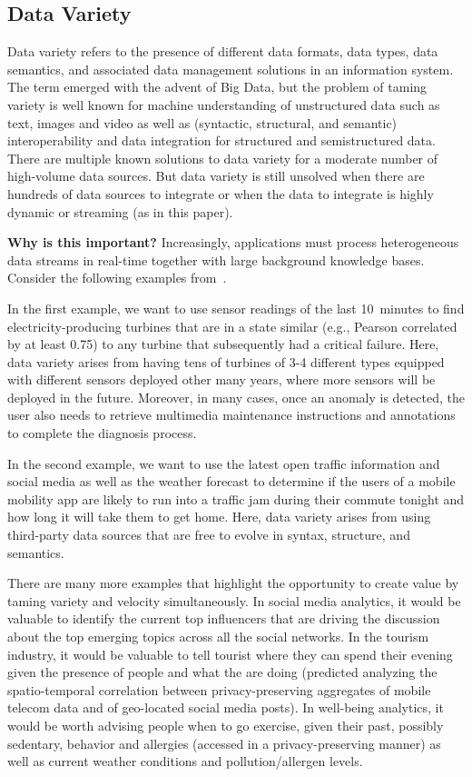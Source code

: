 \subsection{Data Variety}

Data variety refers to the presence of different data formats, data
types, data semantics, and associated data management solutions in an
information system. The term emerged with the advent of Big Data, but
the problem of taming variety is well known for machine understanding
of unstructured data such as text, images and video as well as
(syntactic, structural, and semantic) interoperability and data
integration for structured and semistructured data.  There are
multiple known solutions to data variety for a moderate number of
high-volume data sources.  But data variety is still unsolved when
there are hundreds of data sources to integrate or when the data to
integrate is highly dynamic or streaming (as in this paper).

\textbf{Why is this important?}
%
Increasingly, applications must process heterogeneous data streams in
real-time together with large background knowledge bases. Consider the
following examples from~\cite{DellAglioDataScience2017}.

In the first example, we want to use sensor readings of the last
10~minutes to find electricity-producing turbines that are in a state
similar (e.g., Pearson correlated by at least 0.75) to any turbine
that subsequently had a critical failure. Here, data variety arises
from having tens of turbines of 3-4 different types equipped with
different sensors deployed other many years, where more sensors will be
deployed in the future. Moreover, in many cases, once an anomaly is
detected, the user also needs to retrieve multimedia maintenance
instructions and annotations to complete the diagnosis process.

In the second example, we want to use the latest open traffic
information and social media as well as the weather forecast to
determine if the users of a mobile mobility app are likely to run into
a traffic jam during their commute tonight and how long it will take
them to get home. Here, data variety arises from using third-party
data sources that are free to evolve in syntax, structure, and
semantics.

There are many more examples that highlight the opportunity to create
value by taming variety and velocity simultaneously. In social media
analytics, it would be valuable to identify the current top
influencers that are driving the discussion about the top emerging
topics across all the social networks. In the tourism industry, it
would be valuable to tell tourist where they can spend their evening
given the presence of people and what the are doing (predicted
analyzing the spatio-temporal correlation between privacy-preserving
aggregates of mobile telecom data and of geo-located social media
posts). In well-being analytics, it would be worth advising people when
to go exercise, given their past, possibly sedentary, behavior and
allergies (accessed in a privacy-preserving manner) as well as current
weather conditions and pollution/allergen levels.

